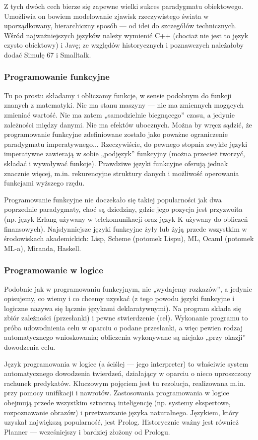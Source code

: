 \documentclass[a4paper,12pt,oneside]{book}
\begin{document}
				Z tych dwóch cech bierze się zapewne wielki sukces paradygmatu obiektowego. Umożliwia on bowiem modelowanie zjawisk rzeczywistego świata w uporządkowany, hierarchiczny sposób — od idei do szczegółów technicznych. Wśród najważniejszych języków należy wymienić C++ (chociaż nie jest to język czysto obiektowy) i Javę; ze względów historycznych i poznawczych należałoby dodać Simulę 67 i Smalltalk.
				\subsubsection{Programowanie funkcyjne}
				Tu po prostu składamy i obliczamy funkcje, w sensie podobnym do funkcji znanych z matematyki. Nie ma stanu maszyny — nie ma zmiennych mogących zmieniać wartość. Nie ma zatem „samodzielnie biegnącego” czasu, a jedynie zależności między danymi. Nie ma efektów ubocznych. Można by wręcz sądzić, że programowanie funkcyjne zdefiniowane zostało jako poważne ograniczenie paradygmatu imperatywnego... Rzeczywiście, do pewnego stopnia zwykłe języki imperatywne zawierają w sobie „podjęzyk” funkcyjny (można przecież tworzyć, składać i wywoływać funkcje). Prawdziwe języki funkcyjne oferują jednak znacznie więcej, m.in. rekurencyjne struktury danych i możliwość operowania funkcjami wyższego rzędu.
				
				Programowanie funkcyjne nie doczekało się takiej popularności jak dwa poprzednie paradygmaty, choć są dziedziny, gdzie jego pozycja jest przyzwoita (np. język Erlang używany w telekomunikacji oraz język K używany do obliczeń finansowych). Najsłynniejsze języki funkcyjne żyły lub żyją przede wszystkim w środowiskach akademickich: Lisp, Scheme (potomek Lispu), ML, Ocaml (potomek ML-a), Miranda, Haskell.
				\subsubsection{Programowanie w logice}
				Podobnie jak w programowaniu funkcyjnym, nie „wydajemy rozkazów”, a jedynie opisujemy, co wiemy i co chcemy uzyskać (z tego powodu języki funkcyjne i logiczne nazywa się łącznie językami deklaratywnymi). Na program składa się zbiór zależności (przesłanki) i pewne stwierdzenie (cel). Wykonanie programu to próba udowodnienia celu w oparciu o podane przesłanki, a więc pewien rodzaj automatycznego wnioskowania; obliczenia wykonywane są niejako „przy okazji” dowodzenia celu.
				
				Język programowania w logice (a ściślej — jego interpreter) to właściwie system automatycznego dowodzenia twierdzeń, działający w oparciu o nieco uproszczony rachunek predykatów. Kluczowym pojęciem jest tu rezolucja, realizowana m.in. przy pomocy unifikacji i nawrotów. Zastosowania programowania w logice obejmują przede wszystkim sztuczną inteligencję (np. systemy ekspertowe, rozpoznawanie obrazów) i przetwarzanie języka naturalnego. Językiem, który uzyskał największą popularność, jest Prolog. Historycznie ważny jest również Planner — wcześniejszy i bardziej złożony od Prologu.
				
\end{document}
